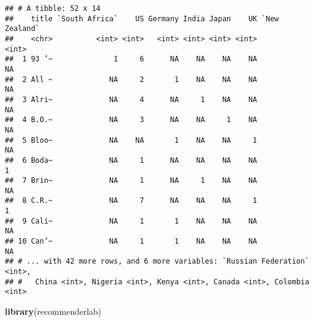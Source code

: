 \documentclass[
]{article}
\newenvironment{Shaded}{\begin{snugshade}}{\end{snugshade}}
\newcommand{\DataTypeTok}[1]{\textcolor[rgb]{0.13,0.29,0.53}{#1}}
\newcommand{\DecValTok}[1]{\textcolor[rgb]{0.00,0.00,0.81}{#1}}
\newcommand{\KeywordTok}[1]{\textcolor[rgb]{0.13,0.29,0.53}{\textbf{#1}}}
\newcommand{\NormalTok}[1]{#1}
\newcommand{\OperatorTok}[1]{\textcolor[rgb]{0.81,0.36,0.00}{\textbf{#1}}}
\newcommand{\StringTok}[1]{\textcolor[rgb]{0.31,0.60,0.02}{#1}}
\begin{document}
\begin{verbatim}
## # A tibble: 52 x 14
##    title `South Africa`    US Germany India Japan    UK `New Zealand`
##    <chr>          <int> <int>   <int> <int> <int> <int>         <int>
##  1 93 ’~              1     6      NA    NA    NA    NA            NA
##  2 All ~             NA     2       1    NA    NA    NA            NA
##  3 Alri~             NA     4      NA     1    NA    NA            NA
##  4 B.O.~             NA     3      NA    NA     1    NA            NA
##  5 Bloo~             NA    NA       1    NA    NA     1            NA
##  6 Boda~             NA     1      NA    NA    NA    NA             1
##  7 Brin~             NA     1      NA     1    NA    NA            NA
##  8 C.R.~             NA     7      NA    NA    NA     1             1
##  9 Cali~             NA     1       1    NA    NA    NA            NA
## 10 Can’~             NA     1       1    NA    NA    NA            NA
## # ... with 42 more rows, and 6 more variables: `Russian Federation` <int>,
## #   China <int>, Nigeria <int>, Kenya <int>, Canada <int>, Colombia <int>
\end{verbatim}

\begin{Shaded}
\begin{Highlighting}[]
\KeywordTok{library}\NormalTok{(recommenderlab)}
\end{Highlighting}
\end{Shaded}

\begin{Shaded}
\end{Shaded}
\end{document}
